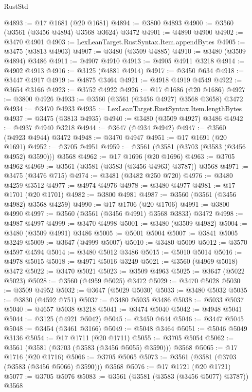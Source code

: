 \begin{lexlean}{RustStd}
\begin{coremodule}
@4893 := @17 @1681 (@20 @1681)
@4894 := @3800 @4893
@4900 := @3560 (@3561 (@3456 @4894) @3568 @3624) @3472
@4901 := @4890 @4900
@4902 := @3470 @4901
@4903 := LexLeanTarget.RustSyntax.Item.appendBytes
@4905 := @3475 (@3813 @4903)
@4907 := @3480 (@3509 @4885)
@4910 := @3480 (@3509 @4894) @3486
@4911 := @4907 @4910
@4913 := @4905 @4911 @3218
@4914 := @4902 @4913
@4916 := @3125 (@4881 @4914)
@4917 := @3450 @634
@4918 := @3447 @4917
@4919 := @4875 @3464
@4921 := @4918 @4919 @4549
@4922 := @3654 @3166
@4923 := @3752 @4922
@4926 := @17 @1686 (@20 @1686)
@4927 := @3800 @4926
@4933 := @3560 (@3561 (@3456 @4927) @3568 @3658) @3472
@4934 := @3470 @4933
@4935 := LexLeanTarget.RustSyntax.Item.lengthBytes
@4937 := @3475 (@3813 @4935)
@4940 := @3480 (@3509 @4927) @3486
@4942 := @4937 @4940 @3218
@4944 := @3647 (@4934 @4942)
@4947 := @3560 (@4923 @4944) @3472
@4948 := @3470 @4947
@4951 := @17 @1691 (@20 @1691)
@4952 := @3705 @4951
@4959 := @3561 (@3581 (@3703 (@3583 (@3456 @4952) @3590))) @3568
@4962 := @17 @1696 (@20 @1696)
@4963 := @3705 @4962
@4969 := @3561 (@3581 (@3583 (@3456 @4963) @3787)) @3568
@4971 := @3475 (@3476 @715)
@4974 := @3481 (@3482 @250 @720)
@4976 := @3480 @4259 @3512
@4977 := @4974 @4976
@4978 := @3480 @4977
@4981 := @17 @1701 (@20 @1701)
@4982 := @3800 @4981
@4987 := @3560 (@3561 (@3456 @4982) @3568 @4259)
@4990 := @17 @1706 (@20 @1706)
@4991 := @3800 @4990
@4997 := @3560 (@3561 (@3456 @4991) @3568 @3833) @3472
@4998 := @4987 @4997
@4999 := @3470 @4998
@5001 := @3480 (@3509 @4982)
@5004 := @3480 (@3509 @4991) @3486
@5005 := @5001 @5004
@5007 := @3841 @5005 @3249
@5009 := @3647 (@4999 @5007)
@5010 := @3480 @5009
@5012 := @3570 @4597 @4594
@5014 := @3480 @5012 @3486
@5015 := @5010 @5014
@5016 := @4978 @5015
@5018 := @4971 @5016 @3249
@5021 := @3560 (@4969 @5018) @3472
@5022 := @3470 @5021
@5023 := @3509 @4963
@5025 := @3647 (@5022 @5023)
@5028 := @3560 (@4959 @5025) @3472
@5029 := @3470 @5028
@5030 := @3509 @4952
@5032 := @3647 (@5029 @5030)
@5033 := @3480 @5032
@5035 := @3830 (@4592 @751)
@5037 := @3480 @5035 @3486
@5038 := @5033 @5037
@5040 := @4657 @5038 @3218
@5041 := @3474 @5040
@5042 := @4948 @5041
@5044 := @3125 (@4921 @5042)
@5045 := @3450 @644
@5046 := @3447 @5045
@5048 := @3454 (@3461 @3166)
@5049 := @5048 @3464
@5051 := @5046 @5049 @3136
@5054 := @17 @1711 (@20 @1711)
@5055 := @3705 @5054
@5062 := @3561 (@3581 (@3703 (@3583 (@3456 @5055) @3590))) @3568
@5065 := @17 @1716 (@20 @1716)
@5066 := @3705 @5065
@5073 := @3561 (@3581 (@3703 (@3583 (@3456 @5066) @3590))) @3568
@5076 := @17 @1721 (@20 @1721)
@5077 := @3705 @5076
@5083 := @3561 (@3581 (@3583 (@3456 @5077) @3787)) @3568

\end{coremodule}
\end{lexlean}
